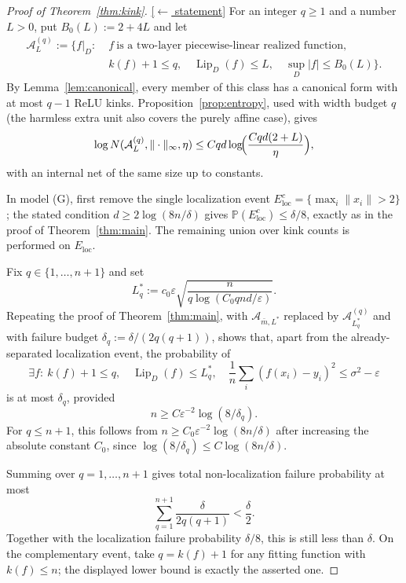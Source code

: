 \documentclass[11pt,reqno]{amsart}
\theoremstyle{plain}
\theoremstyle{definition}
\theoremstyle{remark}
\newcommand{\PP}{\mathbb{P}}
\newcommand{\eps}{\varepsilon}
\newcommand{\Lip}{\operatorname{Lip}}
\newcommand{\AAA}{\mathcal{A}}
\newcommand{\stmtbutton}[1]{\hyperref[#1]{\textnormal{\footnotesize\textsf{[$\leftarrow$ statement]}}}}
\begin{document}
\begin{proof}[Proof of Theorem~\textup{\ref{thm:kink}}]\label{proof:kink}\stmtbutton{thm:kink}
For an integer $q\ge1$ and a number $L>0$, put $B_0(L):=2+4L$ and let
\[
\begin{aligned}
\AAA^{(q)}_L:=\{f|_D:\;& f\ \text{is a two-layer piecewise-linear realized function},\\
& k(f)+1\le q,\quad \Lip_D(f)\le L,\quad \sup_D|f|\le B_0(L)\}.
\end{aligned}
\]
By Lemma~\ref{lem:canonical}, every member of this class has a canonical form with at most $q-1$ ReLU kinks. Proposition~\ref{prop:entropy}, used with width budget $q$ (the harmless extra unit also covers the purely affine case), gives
\[
        \log N(\AAA^{(q)}_L,\|\cdot\|_\infty,\eta)\le Cqd\log\!\Bigl(\frac{Cqd(2+L)}{\eta}\Bigr),
\]
with an internal net of the same size up to constants.

In model (G), first remove the single localization event $E_{\mathrm{loc}}^c=\{\max_i\|x_i\|>2\}$; the stated condition $d\ge2\log(8n/\delta)$ gives $\PP(E_{\mathrm{loc}}^c)\le\delta/8$, exactly as in the proof of Theorem~\ref{thm:main}. The remaining union over kink counts is performed on $E_{\mathrm{loc}}$.

Fix $q\in\{1,\dots,n+1\}$ and set
\[
        L_q^\ast:=c_0\eps\sqrt{\frac{n}{q\log(C_0qnd/\eps)}}.
\]
Repeating the proof of Theorem~\ref{thm:main}, with $\AAA_{\bar m,L^\ast}$ replaced by $\AAA^{(q)}_{L_q^\ast}$ and with failure budget $\delta_q:=\delta/(2q(q+1))$, shows that, apart from the already-separated localization event, the probability of
\[
\exists f:\ k(f)+1\le q,\quad \Lip_D(f)\le L_q^\ast,\quad
\frac1n\sum_i(f(x_i)-y_i)^2\le\sigma^2-\eps
\]
is at most $\delta_q$, provided
\[
        n\ge C\eps^{-2}\log(8/\delta_q).
\]
For $q\le n+1$, this follows from $n\ge C_0\eps^{-2}\log(8n/\delta)$ after increasing the absolute constant $C_0$, since $\log(8/\delta_q)\le C\log(8n/\delta)$.

Summing over $q=1,\dots,n+1$ gives total non-localization failure probability at most
\[
        \sum_{q=1}^{n+1}\frac{\delta}{2q(q+1)}<\frac\delta2.
\]
Together with the localization failure probability $\delta/8$, this is still less than $\delta$.
On the complementary event, take $q=k(f)+1$ for any fitting function with $k(f)\le n$; the displayed lower bound is exactly the asserted one.
\end{proof}
\end{document}
